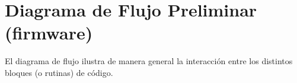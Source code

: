 \section{Diagrama de Flujo Preliminar (firmware)}
    El diagrama de flujo ilustra de manera general la interacción entre los
    distintos bloques (o rutinas) de código.



